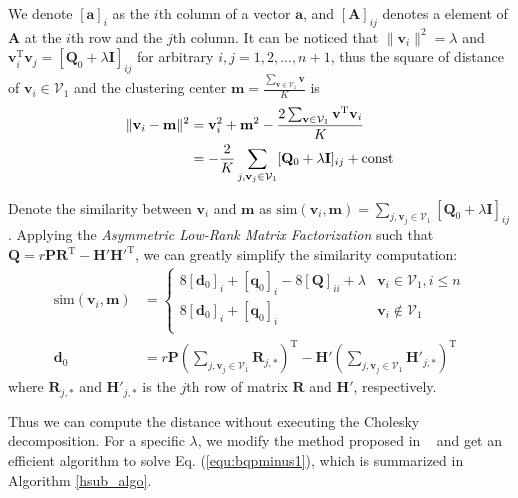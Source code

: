 \documentclass[conference]{IEEEtran}
\begin{document}
We denote $[\mathbf{a}]_i$ as the $i$th column of a vector $\mathbf{a}$, and $[\mathbf{A}]_{ij}$ denotes a element of $\mathbf{A}$ at the $i$th row and the $j$th column. It can be noticed that $\| \mathbf{v}_i \|^2=\lambda$ and $\mathbf{v}_i^\mathrm{T}\mathbf{v}_j=[\mathbf{Q}_0+\lambda\mathbf{I}]_{ij}$ for arbitrary $i,j=1,2,...,n+1$, thus the square of distance of $\mathbf{v}_i \in \mathcal{V}_1$ and the clustering center $\mathbf{m}=\frac{\sum_{\mathbf{v} \in \mathcal{V}_1} \mathbf{v}}{K}$ is
\begin{equation}
\begin{split}
\Arrowvert \mathbf{v}_i-\mathbf{m} \Arrowvert^2 &= \mathbf{v}_i^2 + \mathbf{m}^2 - \frac{2 \sum_{\mathbf{v} \in \mathcal{V}_1} \mathbf{v}^\mathrm{T} \mathbf{v}_i}{K} \\
&= -\frac{2}{K} \sum_{j, \mathbf{v}_j \in \mathcal{V}_1} [\mathbf{Q}_0+\lambda\mathbf{I}]_{ij} + \mathrm{const}
\end{split}
\end{equation}

Denote the similarity between $\mathbf{v}_i$ and $\mathbf{m}$ as $ \mathrm{sim}(\mathbf{v}_i, \mathbf{m})=\sum_{j, \mathbf{v}_j \in \mathcal{V}_1} [\mathbf{Q}_0+\lambda\mathbf{I}]_{ij}$. Applying the {\em Asymmetric Low-Rank Matrix Factorization} such that $\mathbf{Q}=r\mathbf{P}\mathbf{R}^\mathrm{T} - \mathbf{H}{'} \mathbf{H}{'} ^{\mathrm{T}}$, we can greatly simplify the similarity computation:
\begin{equation}
\begin{split}
\mathrm{sim}(\mathbf{v}_i, \mathbf{m}) &= 
\begin{cases}
8[\mathbf{d}_0]_i + [\mathbf{q}_0]_i - 8[\mathbf{Q}]_{ii} + \lambda & \mathbf{v}_i \in \mathcal{V}_1, i \le n \\
8[\mathbf{d}_0]_i + [\mathbf{q}_0]_i & \mathbf{v}_i \notin \mathcal{V}_1 \\
\end{cases} \\
\mathbf{d}_0&=r\mathbf{P}(\sum_{j, \mathbf{v}_j \in \mathcal{V}_1} \mathbf{R}_{j,*})^\mathrm{T}-\mathbf{H}{'} (\sum_{j, \mathbf{v}_j \in \mathcal{V}_1} \mathbf{H}{'}_{j,*})^\mathrm{T}
\end{split}
\label{equ:dist}
\end{equation}
where $\mathbf{R}_{j,*}$ and $\mathbf{H}{'}_{j,*}$ is the $j$th row of matrix $\mathbf{R}$ and $\mathbf{H}{'}$, respectively.

Thus we can compute the distance without executing the Cholesky decomposition. For a specific $\lambda$, we modify the method proposed in ~\cite{yang2013new} and get an efficient algorithm to solve Eq. (\ref{equ:bqpminus1}), which is summarized in Algorithm \ref{hsub_algo}.
\end{document}
